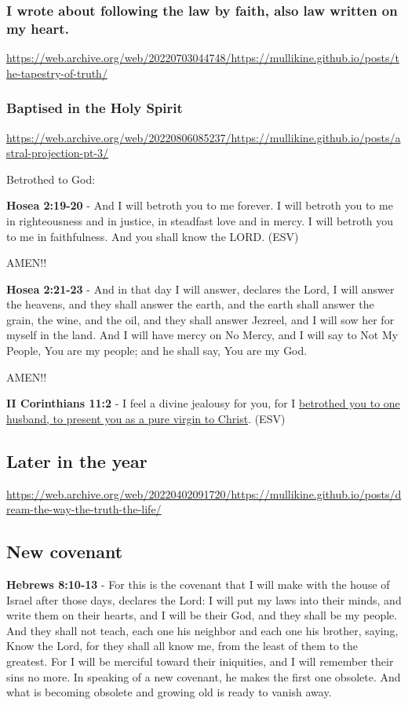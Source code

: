 \documentclass[11pt]{article}
\begin{document}
\subsubsection{I wrote about following the law by faith, also law written on my heart.}
\label{sec:org9f68d28}

\url{https://web.archive.org/web/20220703044748/https://mullikine.github.io/posts/the-tapestry-of-truth/}

\subsubsection{Baptised in the Holy Spirit}
\label{sec:orgdff3c01}
\url{https://web.archive.org/web/20220806085237/https://mullikine.github.io/posts/astral-projection-pt-3/}

Betrothed to God:

\textbf{Hosea 2:19-20} - And I will betroth you to me forever. I will betroth you to me in righteousness and in justice, in steadfast love and in mercy. I will betroth you to me in faithfulness. And you shall know the LORD. (ESV)

AMEN!!

\textbf{Hosea 2:21-23} - And in that day I will answer, declares the Lord, I will answer the heavens, and they shall answer the earth, and the earth shall answer the grain, the wine, and the oil, and they shall answer Jezreel, and I will sow her for myself in the land. And I will have mercy on No Mercy, and I will say to Not My People, You are my people; and he shall say, You are my God.

AMEN!!

\textbf{II Corinthians 11:2} - I feel a divine jealousy for you, for I \uline{betrothed you to one husband, to present you as a pure virgin to Christ}. (ESV)

\subsection{Later in the year}
\label{sec:org43c945a}
\url{https://web.archive.org/web/20220402091720/https://mullikine.github.io/posts/dream-the-way-the-truth-the-life/}

\subsection{New covenant}
\label{sec:orgb2bb8da}
\textbf{Hebrews 8:10-13} - For this is the covenant that I will make with the house of Israel after those days, declares the Lord: I will put my laws into their minds, and write them on their hearts, and I will be their God, and they shall be my people. And they shall not teach, each one his neighbor and each one his brother, saying, Know the Lord, for they shall all know me, from the least of them to the greatest. For I will be merciful toward their iniquities, and I will remember their sins no more. In speaking of a new covenant, he makes the first one obsolete. And what is becoming obsolete and growing old is ready to vanish away.
\end{document}
